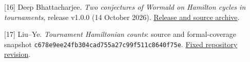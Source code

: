 \documentclass[11pt,a4paper]{article}
\begin{document}
{[}16{]} Deep Bhattacharjee. \emph{Two conjectures of Wormald on Hamilton cycles in tournaments}, release v1.0.0 (14 October 2026). \href{https://github.com/creelie/Breakthrough-problems-1/releases/tag/v1.0.0}{Release and source archive}.

{[}17{]} Liu--Ye. \emph{Tournament Hamiltonian counts}: source and formal-coverage snapshot \nolinkurl{c678e9ee24fb304cad755a27c99f511c8640f75e}. \href{https://github.com/LStar404/tournament-hamiltonian-counts-20261028/tree/c678e9ee24fb304cad755a27c99f511c8640f75e}{Fixed repository revision}.
\end{document}
